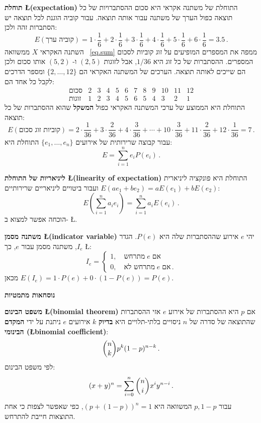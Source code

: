 \textbf{תוחלת \L{\small (expectation)}}
התוחלת של משתנה אקראי היא סכום ההסתברויות של כל תוצאה כפול הערך של משתנה עבור אותה תוצאה. עבור קוביה הוגנת לכל תוצאה יש הסתברות זהה ולכן:
\[
E(\textrm{קוביה ערך})=1\cdot \frac{1}{6} + 2\cdot\frac{1}{6} + 3\cdot\frac{1}{6} + 4\cdot\frac{1}{6} + 5\cdot\frac{1}{6} + 6\cdot\frac{1}{6}=3.5\,.
\]
השתנה האקראי
$X$
ממשוואה%
~\ref{eq.sum}
ממפה את המספרים המופיעים על זוג קוביות לסכום המספרים. ההסתברות של כל זוג היא
$1/36$,
אבל לזוגות
$(2,5)$
ו-%
$(5,2)$
אותו סכום ולכן הם שייכים לאותה תוצאה. הערכים של המשתנה האקראי הם
$\{2,\ldots,12\}$
ומספר הדרכים לקבל כל אחד הם:
\[
\begin{array}{l|rrrrrrrrrrr}
\textrm{סכום} & 2 & 3 & 4 & 5 & 6 & 7 & 8 & 9 & 10 & 11 & 12\\\hline
\textrm{זוגות} & 1 & 2 & 3 & 4 & 5 & 6 & 5 & 4 & 3 & 2 & 1
\end{array}
\]
התוחלת היא הממוצע של ערכי המשתנה האקראי כפול 
\textbf{המשקל}
שהוא ההסתברות של כל תוצאה:
\[
E(\textrm{קוביות זוג סכום})=2\cdot \frac{1}{36} + 3\cdot \frac{2}{36} + 4\cdot \frac{3}{36} + 
\cdots + 10\cdot \frac{3}{36} + 11\cdot \frac{2}{36} + 12\cdot \frac{1}{36} = 7\,.
\]
עבור קבוצה שרירותית של אירועים
$\{e_1,\ldots,e_n\}$
התוחלת היא:
\[
E=\sum_{i=1}^{n} e_iP(e_i)\,.
\]

\textbf{ליניאריות של התוחלת \L{\small (linearity of expectation)}}\label{p.linearity}
התוחלת היא פונקציה ליניארית
$E(ae_1 + be_2) = aE(e_1) + bE(e_2)$
ועבור ביטויים ליניאריים שרירותיים:
\[
E\left(\sum_{i=1}^{n} a_ie_i\right)=\sum_{i=1}^{n} a_iE(e_i)\,.
\]
הוכחה אפשר למצוא ב-%
\L{\cite[Section~4.9]{ross}}.

\textbf{משתנה מסמן \L{\small (indicator variable)}}
יהי
$e$
אירוע שההסתברות שלה היא
$P(e)$.
הגדר
$I_e$,
משתנה מסמן עבור 
$e$,
כך
\L{\cite[Chapter~4, Example~3b]{ross}}:
\[
I_e=
\left\{
\begin{array}{ll}
1,\quad \textrm{מתרחש}\; e\;\textrm{אם}\\
0, \quad \textrm{מתרחש לא}\;e\;\textrm{אם}\,.
\end{array}
\right.
\]
מכאן
$E(I_e)=1\cdot P(e) + 0\cdot (1-P(e))=P(e)$.

\bigskip

\textbf{\large נוסחאות מתמטיות}

\textbf{משפט הבינום \L{\small (binomial theorem)}}
אם
$p$
היא ההסתברות של אירוע
$e$
אזי ההסתברות שהתוצאה של סדרה של 
$n$
ניסויים בלתי-תלויים היא
\textbf{בדיוק}
$k$
אירועים 
$e$
ניתנת על ידי
\textbf{המקדם הבינומי (\L{binomial coefficient})}:
\[
\displaystyle{n \choose k} p^k (1-p)^{n-k}\,.
\]
לפי משפט הבינום:
\[
(x+y)^n=\sum_{i=0}^{n} \displaystyle{n \choose i} x^i y^{n-i}\,.
\]
עבור
$p,1-p$
המשוואה היא
$(p+(1-p))^n=1$,
כפי שאפשר לצפות כי אחת התוצאות חייבת להתרחש.

